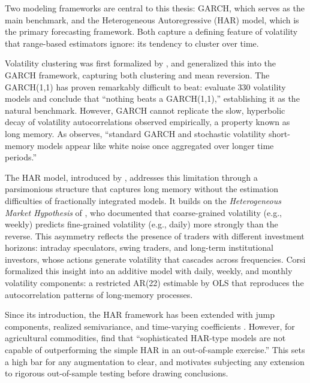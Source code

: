 Two modeling frameworks are central to this thesis: GARCH, which serves
as the main benchmark, and the Heterogeneous Autoregressive (HAR) model,
which is the primary forecasting framework. Both capture a defining
feature of volatility that range-based estimators ignore: its tendency
to cluster over time.

Volatility clustering was first formalized by
\textcite{engle1982autoregressive}, and
\textcite{bollerslev1986generalized} generalized this into the GARCH
framework, capturing both clustering and mean reversion. The GARCH(1,1)
has proven remarkably difficult to beat:
\textcite{hansen2005forecast} evaluate 330 volatility models and conclude
that ``nothing beats a GARCH(1,1),'' establishing it as the natural
benchmark. However, GARCH cannot replicate the slow, hyperbolic decay
of volatility autocorrelations observed empirically, a property known
as long memory. As \textcite{corsiSimpleApproximateLongMemory2008}
observes, ``standard GARCH and stochastic volatility short-memory models
appear like white noise once aggregated over longer time periods.''

The HAR model, introduced by
\textcite{corsiSimpleApproximateLongMemory2008}, addresses this
limitation through a parsimonious structure that captures long memory
without the estimation difficulties of fractionally integrated models.
It builds on the \emph{Heterogeneous Market Hypothesis} of
\textcite{mullerVolatilitiesDifferentTime1997}, who documented that
coarse-grained volatility (e.g., weekly) predicts fine-grained
volatility (e.g., daily) more strongly than the reverse. This asymmetry
reflects the presence of traders with different investment
horizons: intraday speculators, swing traders, and long-term
institutional investors, whose actions generate volatility that
cascades across frequencies. Corsi formalized this insight into an
additive model with daily, weekly, and monthly volatility components:
a restricted AR(22) estimable by OLS that reproduces the autocorrelation
patterns of long-memory processes.

Since its introduction, the HAR framework has been extended with jump
components, realized semivariance, and time-varying coefficients
\parencite{andersen2007roughing, patton2015good,
tianRealizedVolatilityForecasting2017}. However, for agricultural
commodities, \textcite{degiannakisForecastingRealizedVolatility2022}
find that ``sophisticated HAR-type models are not capable of
outperforming the simple HAR in an out-of-sample exercise.'' This sets
a high bar for any augmentation to clear, and motivates subjecting any
extension to rigorous out-of-sample testing before drawing conclusions.

